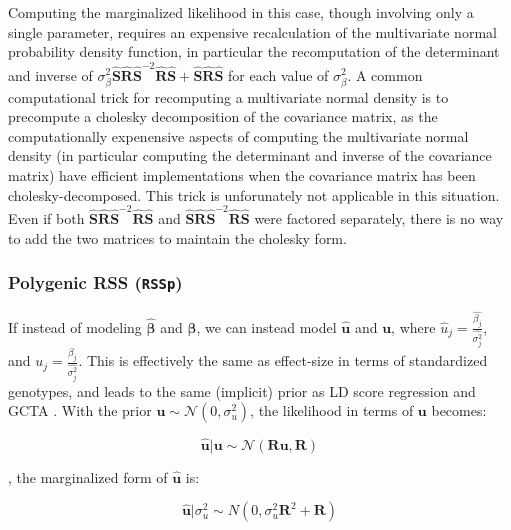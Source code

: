 {Computing the marginalized likelihood in this case, though involving only a single parameter, requires an expensive recalculation of the multivariate normal probability density function, in particular 
the recomputation of the determinant and inverse of \(\sigma_\beta^2\hat{\textbf{S}}\hat{\textbf{R}}\hat{\textbf{S}}^{-2}\hat{\textbf{R}}\hat{\textbf{S}}+\hat{\textbf{S}}\hat{\textbf{R}}\hat{\textbf{S}}\) for each value of 
\(\sigma_\beta^2\).  A common computational trick for recomputing a multivariate normal density is to precompute a cholesky decomposition of the covariance matrix, as the computationally expenensive aspects of computing the multivariate normal density (in particular computing the determinant and inverse of the covariance matrix) have efficient implementations when the covariance matrix has been cholesky-decomposed.  This trick is unforunately not applicable in this situation.  Even if both $\hat{\textbf{S}}\hat{\textbf{R}}\hat{\textbf{S}}^{-2}\hat{\textbf{R}}\hat{\textbf{S}}$ and $\hat{\textbf{S}}\hat{\textbf{R}}\hat{\textbf{S}}^{-2}\hat{\textbf{R}}\hat{\textbf{S}}$ were factored separately, there is no way to add the two matrices to maintain the cholesky form.


\subsubsection{Polygenic RSS (\texttt{RSSp})}\label{sec:org040cb73}

If instead of modeling \(\hat{\boldsymbol{\beta}}\) and \(\boldsymbol{\beta}\), we can instead model $\hat{\textbf{u}}$ and $\textbf{u}$, where $\hat{u}_j=\frac{\hat{\beta_j}}{\hat{\sigma_j^2}}$, and  \(u_j=\frac{\beta_j}{\hat{\sigma_j^2}}\).  This is effectively the same as effect-size in terms of standardized genotypes, and leads to the same (implicit) prior as LD score regression \cite{ldsc} and GCTA \cite{GCTA}.  With the prior $\textbf{u} \sim \mathcal{N}(0,\sigma_u^2)$, the likelihood in terms of $\textbf{u}$ becomes:

$$\hat{\textbf{u}} | \textbf{u} \sim \mathcal{N}(\textbf{R} \textbf{u},\textbf{R})$$

, the marginalized form of $\hat{\textbf{u}}$ is:

\[ \hat{\textbf{u}}|\sigma_u^2 \sim N(0,\sigma_u^2\textbf{R}^2+\textbf{R})\]

}
